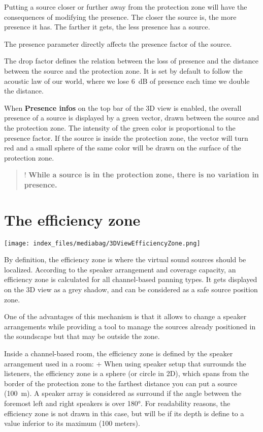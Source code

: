 \documentclass[
  letterpaper,
  DIV=11,
  numbers=noendperiod]{scrreport}
\begin{document}
Putting a source closer or further away from the protection zone will
have the consequences of modifying the presence. The closer the source
is, the more presence it has. The farther it gets, the less presence has
a source.

The presence parameter directly affects the presence factor of the
source.

The drop factor defines the relation between the loss of presence and
the distance between the source and the protection zone. It is set by
default to follow the acoustic law of our world, where we lose 6~dB of
presence each time we double the distance.

When \textbf{Presence infos} on the top bar of the 3D view is enabled,
the overall presence of a source is displayed by a green vector, drawn
between the source and the protection zone. The intensity of the green
color is proportional to the presence factor. If the source is inside
the protection zone, the vector will turn red and a small sphere of the
same color will be drawn on the surface of the protection zone.

\begin{quote}
! \textbf{While a source is in the protection zone, there is no
variation in presence.}
\end{quote}

\hypertarget{sec-about3dview-efficiencyzone}{%
\section{The efficiency zone}\label{sec-about3dview-efficiencyzone}}

\texttt{[image: index\_files/mediabag/3DViewEfficiencyZone.png]}

By definition, the efficiency zone is where the virtual sound sources
should be localized. According to the speaker arrangement and coverage
capacity, an efficiency zone is calculated for all channel-based panning
types. It gets displayed on the 3D view as a grey shadow, and can be
considered as a safe source position zone.

One of the advantages of this mechanism is that it allows to change a
speaker arrangements while providing a tool to manage the sources
already positioned in the soundscape but that may be outside the zone.

Inside a channel-based room, the efficiency zone is defined by the
speaker arrangement used in a room: + When using speaker setup that
surrounds the listeners, the efficiency zone is a sphere (or circle in
2D), which spans from the border of the protection zone to the farthest
distance you can put a source (100~m). A speaker array is considered as
surround if the angle between the foremost left and right speakers is
over 180°. For readability reasons, the efficiency zone is not drawn in
this case, but will be if its depth is define to a value inferior to its
maximum (100 meters).
\end{document}
